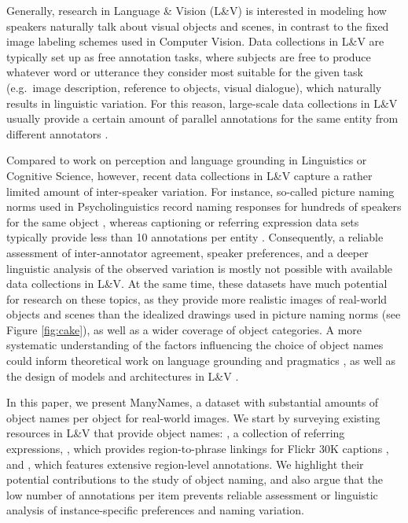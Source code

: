 Generally, research in Language \& Vision (L\&V) is interested in modeling how speakers naturally talk about visual objects and scenes, in contrast to the fixed image labeling schemes used in Computer Vision.
Data collections in L\&V are typically set up as free annotation tasks,  where subjects are free to produce whatever word or utterance they consider most suitable for the given task (e.g.\ image description, reference to objects, visual dialogue), which naturally results in linguistic variation.
For this reason, large-scale data collections in L\&V usually provide a certain amount of parallel annotations for the same entity from different annotators \cite{fangetal:2015,devlin:imcaqui,Kazemzadeh2014,mao15,vries2017guesswhat}.

Compared to work on perception and language grounding in Linguistics or Cognitive Science, however, recent data collections in L\&V capture a rather limited amount of inter-speaker variation.
For instance, so-called picture naming norms used in Psycholinguistics record naming responses for hundreds of speakers for the same object  \cite{snodgrass,rossion2004revisiting}, whereas captioning or referring expression data sets typically provide less than 10 annotations per entity \cite{devlin:imcaqui,Kazemzadeh2014,mao15}.
Consequently, a reliable assessment of inter-annotator agreement, speaker preferences, and a deeper linguistic analysis of the observed variation is mostly not possible with available data collections in  L\&V.
At the same time, these datasets have much potential for research on these topics, as they provide more realistic images of real-world objects and scenes than the idealized drawings used in picture naming norms (see Figure \ref{fig:cake}), as well as a wider coverage of object categories.
A more systematic understanding of the factors influencing the choice of object names could inform theoretical work on language grounding and pragmatics \cite{rohde2012communicating,graf2016animal}, as well as the design of models and architectures in L\&V \cite{lazaridou-dinu-baroni:2015:ACL-IJCNLP,Ordonez:2016,zhao2017open}.

In this paper, we present ManyNames, a dataset with substantial amounts of object names per object for real-world images.
We start by surveying existing resources in L\&V that provide object names:  \cite{Yu2016}, a collection of referring expressions, \flickr \cite{plummer2015flickr30kentities}, which provides region-to-phrase linkings for Flickr 30K captions \cite{young:2014}, and \vgenome \cite{krishna2016visualgenome}, which features extensive region-level annotations. We highlight their potential contributions to the study of object naming, and also argue that the low number of annotations per item prevents reliable assessment or linguistic analysis of instance-specific preferences and naming variation.

